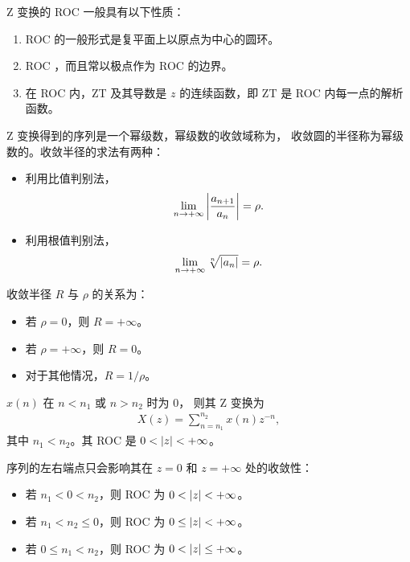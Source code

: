 \begin{property}
    Z 变换的 ROC 一般具有以下性质：
    \begin{enumerate}
        \item ROC 的一般形式是复平面上以原点为中心的圆环。
        \item ROC ，而且常以极点作为 ROC 的边界。
        \item 在 ROC 内，ZT 及其导数是 $z$ 的连续函数，即 ZT 是 ROC 内每一点的解析函数。
    \end{enumerate}
\end{property}

\begin{example}
    Z 变换得到的序列是一个幂级数，幂级数的收敛域称为，
    收敛圆的半径称为幂级数的。收敛半径的求法有两种：
    \begin{itemize}
        \item 利用比值判别法，
            \begin{align*}
                \lim_{n \to +\infty}\left|\frac{a_{n+1}}{a_n}\right| = \rho.
            \end{align*}
        \item 利用根值判别法，
            \begin{align*}
                \lim_{n \to +\infty}\sqrt[n]{\left|a_n\right|} = \rho.
            \end{align*}
    \end{itemize}
    收敛半径 $R$ 与 $\rho$ 的关系为：
    \begin{itemize}
        \item 若 $\rho = 0$，则 $R = +\infty$。
        \item 若 $\rho = +\infty$，则 $R = 0$。
        \item 对于其他情况，$R = 1/\rho$。
    \end{itemize}
\end{example}

\begin{property}
     $x(n)$ 在 $n < n_1$ 或 $n > n_2$ 时为 $0$，
    则其 Z 变换为
    \begin{align*}
        X(z) = \sum_{n=n_1}^{n_2} x(n) z^{-n},
    \end{align*}
    其中 $n_1 < n_2$。其 ROC 是 $0 < \left|z\right| < +\infty$。

    序列的左右端点只会影响其在 $z = 0$ 和 $z = +\infty$ 处的收敛性：
    \begin{itemize}
        \item 若 $n_1 < 0 < n_2$，则 ROC 为 $0 < \left|z\right| < +\infty$。
        \item 若 $n_1 < n_2 \le 0$，则 ROC 为 $0 \le \left|z\right| < +\infty$。
        \item 若 $0 \le n_1 < n_2$，则 ROC 为 $0 < \left|z\right| \le +\infty$。
    \end{itemize}
\end{property}


